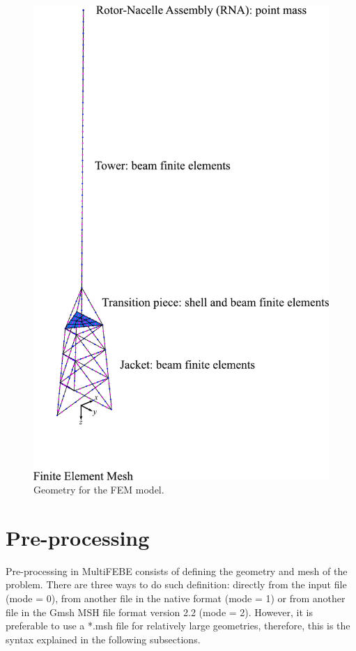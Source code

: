 \documentclass[a4]{article}
\begin{document}
\begin{figure}[tbh!]
	\centering
	\includegraphics[scale=0.5]{owt_model_rigid.pdf}
	\caption{Geometry for the FEM model.}
	\label{fig:geometry1}
\end{figure}

\section{Pre-processing} 
Pre-processing in MultiFEBE consists of defining the geometry and mesh of the problem. There are three ways to do such definition: directly from the input file (mode = 0), from another file in the native format (mode = 1) or from another file in the Gmsh MSH file format version 2.2 (mode = 2). However, it is preferable to use a *.msh file for relatively large geometries, therefore, this is the syntax explained in the following subsections.
   
\end{document}
